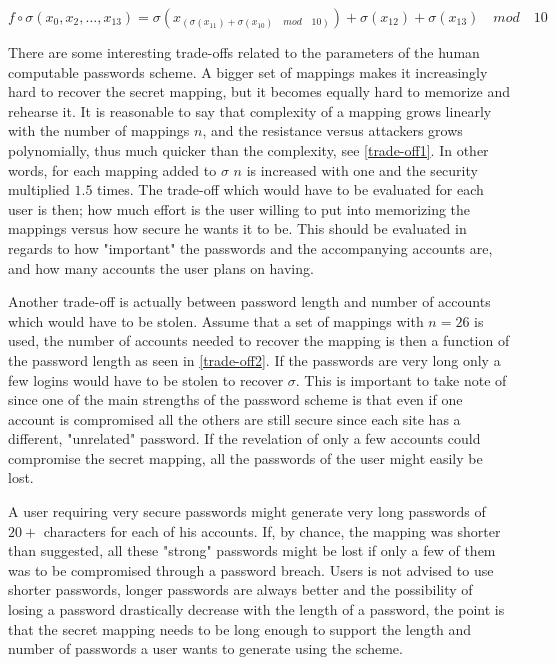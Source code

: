 \begin{definition}
    \label{fo-function}
    $f\circ \sigma(x_0,x_2,\dots,x_{13}) = \sigma ( x_{(\sigma(x_{11}) + \sigma(x_{10})\quad mod \quad 10)} ) +\sigma ( x_{12} ) + \sigma( x_{13} )\quad mod \quad 10$ 
\end{definition}
\par There are some interesting trade-offs related to the parameters of the human computable passwords scheme. A bigger set of mappings makes it increasingly hard to recover the secret mapping, but it becomes equally hard to memorize and rehearse it. It is reasonable to say that complexity of a mapping grows linearly with the number of mappings $n$, and the resistance versus attackers grows polynomially, thus much quicker than the complexity, see \autoref{trade-off1}. In other words, for each mapping added to $\sigma$ $n$ is increased with one and the security multiplied $1.5$ times. The trade-off which would have to be evaluated for each user is then; how much effort is the user willing to put into memorizing the mappings versus how secure he wants it to be. This should be evaluated in regards to how "important" the passwords and the accompanying accounts are, and how many accounts the user plans on having. 
\par Another trade-off is actually between password length and number of accounts which would have to be stolen. Assume that a set of mappings with $n=26$ is used, the number of accounts needed to recover the mapping is then a function of the password length as seen in \autoref{trade-off2}. If the passwords are very long only a few logins would have to be stolen to recover $\sigma$. This is important to take note of since one of the main strengths of the password scheme is that even if one account is compromised all the others are still secure since each site has a different, "unrelated" password. If the revelation of only a few accounts could compromise the secret mapping, all the passwords of the user might easily be lost.
\par A user requiring very secure passwords might generate very long passwords of $20+$ characters for each of his accounts. If, by chance, the mapping was shorter than suggested, all these "strong" passwords might be lost if only a few of them was to be compromised through a password breach. Users is not advised to use shorter passwords, longer passwords are always better and the possibility of losing a password drastically decrease with the length of a password, the point is that the secret mapping needs to be long enough to support the length and number of passwords a user wants to generate using the scheme.
